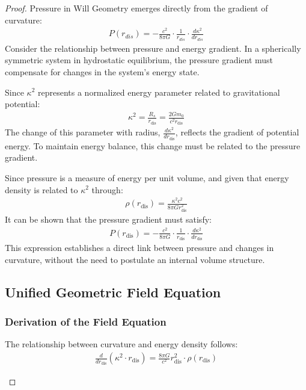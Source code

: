 \documentclass{article}
\begin{document}
\begin{theorem}
\begin{proof}
Pressure in Will Geometry emerges directly from the gradient of curvature:
\begin{align}
P(r_{dis}) = - \frac{c^2}{8\pi G} \cdot \frac{1}{r_{dis}} \cdot \frac{d\kappa^2}{dr_{dis}}
\end{align}
Consider the relationship between pressure and energy gradient. In a spherically symmetric system in hydrostatic equilibrium, the pressure gradient must compensate for changes in the system's energy state.

Since $\kappa^2$ represents a normalized energy parameter related to gravitational potential:
\begin{align}
\kappa^2 = \frac{R_s}{r_{\text{dis}}} = \frac{2Gm_0}{c^2 r_{\text{dis}}}
\end{align}
The change of this parameter with radius, $\frac{d\kappa^2}{dr_{\text{dis}}}$, reflects the gradient of potential energy. To maintain energy balance, this change must be related to the pressure gradient.

Since pressure is a measure of energy per unit volume, and given that energy density is related to $\kappa^2$ through:
\begin{align}
\rho(r_{\text{dis}}) = \frac{\kappa^2 c^2}{8\pi G r_{\text{dis}}^2}
\end{align}
It can be shown that the pressure gradient must satisfy:
\begin{align}
P(r_{\text{dis}}) = - \frac{c^2}{8\pi G} \cdot \frac{1}{r_{\text{dis}}} \cdot \frac{d\kappa^2}{dr_{\text{dis}}}
\end{align}
This expression establishes a direct link between pressure and changes in curvature, without the need to postulate an internal volume structure.

\begin{center}
\end{center}

\subsection{Unified Geometric Field Equation}

\subsubsection{Derivation of the Field Equation}

\begin{theorem}
The relationship between curvature and energy density follows:
\begin{align}
\frac{d}{dr_{\text{dis}}}(\kappa^2 \cdot r_{\text{dis}}) = \frac{8\pi G}{c^2}r_{\text{dis}}^2 \cdot \rho(r_{\text{dis}})
\end{align}
\end{theorem}


\end{proof}
\end{theorem}
\end{document}
